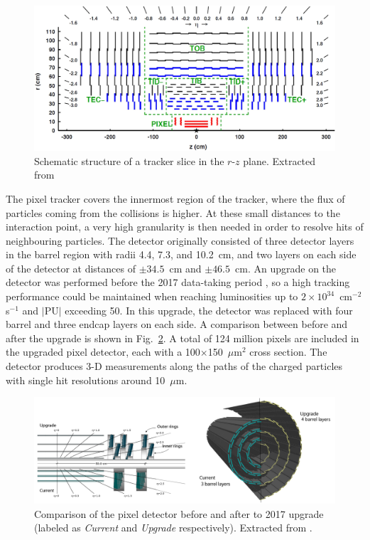\documentclass[../main.tex]{subfiles}
\begin{document}
\begin{figure}[h!]
\begin{center}
\includegraphics[width=\textwidth]{Images/tracker}
\end{center}
\caption[CMS tracker structure]{Schematic structure of a tracker slice in the $r$-$z$ plane. Extracted from \cite{intro:exp:tracker3}}
\label{intro:fig:tracker}
\end{figure}

The pixel tracker covers the innermost region of the tracker, where the flux of particles coming from the collisions is higher. At these small distances to the interaction point, a very high granularity is then needed in order to resolve hits of neighbouring particles. The detector originally consisted of three detector layers in the barrel region with radii 4.4, 7.3, and 10.2~cm, and two layers on each side of the detector at distances of $\pm34.5$~cm and $\pm46.5$~cm. An upgrade on the detector was performed before the 2017 data-taking period \cite{intro:exp:tracker_upgrade}, so a high tracking performance could be maintained when reaching luminosities up to $2\times10^{34}$~cm${}^{-2}$s${}^{-1}$ and $|\text{PU}|$ exceeding 50. In this upgrade, the detector was replaced with four barrel and three endcap layers on each side. A comparison between before and after the upgrade is shown in Fig.~\ref{intro:fig:tracker_upgrade}. A total of 124 million pixels are included in the upgraded pixel detector, each with a 100$\times$150~$\mu$m${}^2$ cross section. The detector produces 3-D measurements along the paths of the charged particles with single hit resolutions around 10~$\mu$m.

\begin{figure}[h!]
\begin{center}
\includegraphics[width=\textwidth]{Images/tracker_upgrade}
\end{center}
\caption[CMS pixel detector upgrade]{Comparison of the pixel detector before and after to 2017 upgrade (labeled as \textit{Current} and \textit{Upgrade} respectively). Extracted from \cite{intro:exp:tracker_upgrade}.}
\label{intro:fig:tracker_upgrade}
\end{figure}
\end{document}
